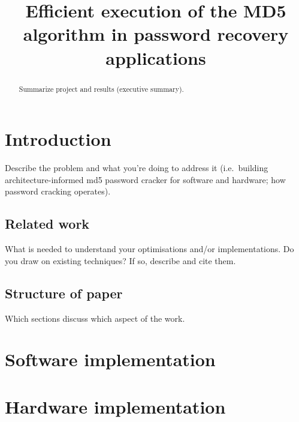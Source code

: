 


\title{Efficient execution of the MD5 algorithm in password recovery applications}

\author{
}

\maketitle


\begin{abstract}
Summarize project and results (executive summary).
\end{abstract}

\section{Introduction}
Describe the problem and what you're doing to address it (i.e.\ building architecture-informed md5 password cracker for software and hardware; how password cracking operates).  

\subsection{Related work}
What is needed to understand your optimisations and/or implementations.  Do you draw on existing techniques? If so, describe and cite them.

\subsection{Structure of paper}
Which sections discuss which aspect of the work.

\section{Software implementation}



\section{Hardware implementation}

%

